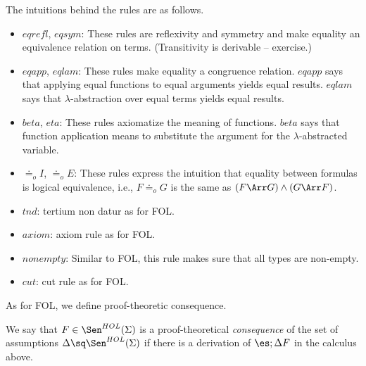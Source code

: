 The intuitions behind the rules are as follows.
\begin{itemize}
 \item $eqrefl$, $eqsym$: These rules are reflexivity and symmetry and make equality an equivalence relation on terms. (Transitivity is derivable -- exercise.)
 \item $eqapp$, $eqlam$: These rules make equality a congruence relation. $eqapp$ says that applying equal functions to equal arguments yields equal results. $eqlam$ says that $\lambda$-abstraction over equal terms yields equal results.
 \item $beta$, $eta$: These rules axiomatize the meaning of functions. $beta$ says that function application means to substitute the argument for the $\lambda$-abstracted variable.
 \item $\doteq_o I$, $\doteq_o E$: These rules express the intuition that equality between formulas is logical equivalence, i.e., $F\doteq_o G$ is the same as $(F\impl G) \wedge (G\impl F)$.
 \item $tnd$: tertium non datur as for FOL.
 \item $axiom$: axiom rule as for FOL.
 \item $nonempty$: Similar to FOL, this rule makes sure that all types are non-empty.
 \item $cut$: cut rule as for FOL.
\end{itemize}
\medskip

As for FOL, we define proof-theoretic consequence.
\begin{definition}
We say that $F\in\Sen^{HOL}(\Sigma)$ is a proof-theoretical \emph{consequence} of the set of assumptions $\Delta\sq\Sen^{HOL}(\Sigma)$ if there is a derivation of $\es;\Delta\der F$ in the calculus above.
\end{definition}

